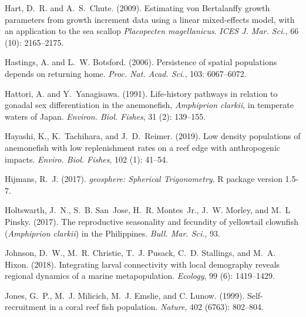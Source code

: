 \documentclass[12pt, oneside]{article}   	%
\begin{document}
\begin{thebibliography}{66}
Hart, D.~R. and A.~S.~Chute. (2009).
\newblock Estimating von Bertalanffy growth parameters from growth increment
  data using a linear mixed-effects model, with an application to the sea
  scallop \textit{Placopecten magellanicus}.
\newblock \emph{ICES J. Mar. Sci.}, 66 (10):
  2165--2175.

Hastings, A. and L.~W. Botsford. (2006).
\newblock Persistence of spatial populations depends on returning home.
\newblock \emph{Proc. Nat. Acad. Sci.}, 103:
  6067--6072.

Hattori, A. and Y.~Yanagisawa. (1991).
\newblock Life-history pathways in relation to gonadal sex differentiation in
  the anemonefish, \textit{Amphiprion clarkii}, in temperate waters of Japan.
\newblock \emph{Environ. Biol. Fishes}, 31 (2):
  139--155.

Hayashi, K., K.~Tachihara, and J.~D.~Reimer. (2019).
\newblock Low density populations of anemonefish with low replenishment rates
  on a reef edge with anthropogenic impacts.
\newblock \emph{Enviro. Biol. Fishes}, 102 (1):
  41--54.

Hijmans, R.~J. (2017).
\newblock \emph{geosphere: Spherical Trigonometry}.
\newblock R package version 1.5-7.

Holtswarth, J.~N., S.~B. San~Jose, H.~R. Montes~Jr., J.~W.
  Morley, and M.~L Pinsky. (2017).
\newblock The reproductive seasonality and fecundity of yellowtail clownfish
  (\textit{Amphiprion clarkii}) in the Philippines.
\newblock \emph{Bull. Mar. Sci.}, 93.

Johnson, D.~W., M.~R. Christie, T.~J. Pusack, C.~D. Stallings,
  and M.~A. Hixon. (2018).
\newblock Integrating larval connectivity with local demography reveals
  regional dynamics of a marine metapopulation.
\newblock \emph{Ecology}, 99 (6): 1419--1429.

Jones, G.~P., M.~J. Milicich, M.~J. Emslie, and C. Lunow. (1999).
\newblock Self-recruitment in a coral reef fish population.
\newblock \emph{Nature}, 402 (6763): 802--804.


\end{thebibliography}
\end{document}
